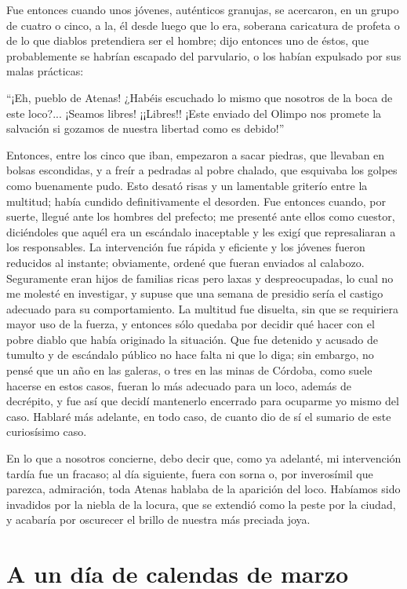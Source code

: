 \documentclass[11pt,openany]{book}
\begin{document}
Fue entonces cuando unos jóvenes, auténticos granujas, se acercaron, en un grupo de cuatro o cinco, a la, él desde luego que lo era, soberana caricatura de profeta o de lo que diablos pretendiera ser el hombre; dijo entonces uno de éstos, que probablemente se habrían escapado del parvulario, o los habían expulsado por sus malas prácticas: 

“¡Eh, pueblo de Atenas! ¿Habéis escuchado lo mismo que nosotros de la boca de este loco?... ¡Seamos libres! ¡¡Libres!! ¡Este enviado del Olimpo nos promete la salvación si gozamos de nuestra libertad como es debido!” 

Entonces, entre los cinco que iban, empezaron a sacar piedras, que llevaban en bolsas escondidas, y a freír a pedradas al pobre chalado, que esquivaba los golpes como buenamente pudo. Esto desató risas y un lamentable griterío entre la multitud; había cundido definitivamente el desorden. Fue entonces cuando, por suerte, llegué ante los hombres del prefecto; me presenté ante ellos como cuestor, diciéndoles que aquél era un escándalo inaceptable y les exigí que represaliaran a los responsables. La intervención fue rápida y eficiente y los jóvenes fueron reducidos al instante; obviamente, ordené que fueran enviados al calabozo. Seguramente eran hijos de familias ricas pero laxas y despreocupadas, lo cual no me molesté en investigar, y supuse que una semana de presidio sería el castigo adecuado para su comportamiento. La multitud fue disuelta, sin que se requiriera mayor uso de la fuerza, y entonces sólo quedaba por decidir qué hacer con el pobre diablo que había originado la situación. Que fue detenido y acusado de tumulto y de escándalo público no hace falta ni que lo diga; sin embargo, no pensé que un año en las galeras, o tres en las minas de Córdoba, como suele hacerse en estos casos, fueran lo más adecuado para un loco, además de decrépito, y fue así que decidí mantenerlo encerrado para ocuparme yo mismo del caso. Hablaré más adelante, en todo caso, de cuanto dio de sí el sumario de este curiosísimo caso. 

En lo que a nosotros concierne, debo decir que, como ya adelanté, mi intervención tardía fue un fracaso; al día siguiente, fuera con sorna o, por inverosímil que parezca, admiración, toda Atenas hablaba de la aparición del loco. Habíamos sido invadidos por la niebla de la locura, que se extendió como la peste por la ciudad, y acabaría por oscurecer el brillo de nuestra más preciada joya.

\chapter{A un día de calendas de marzo}
\end{document}
